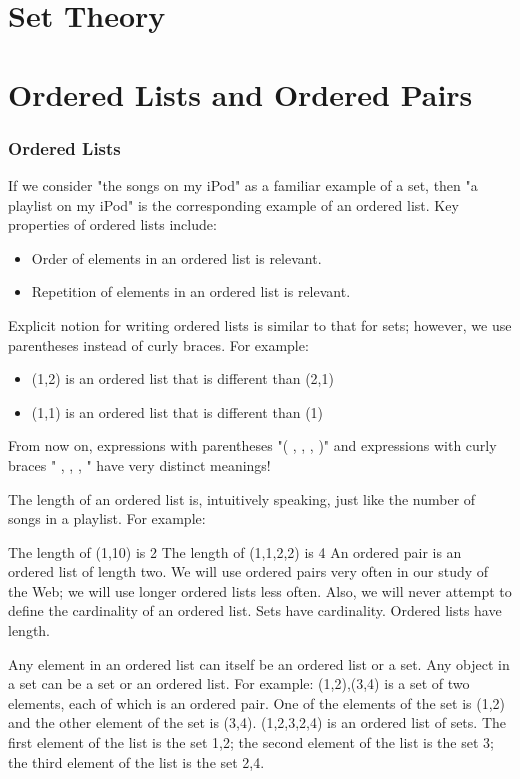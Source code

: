\documentclass{beamer}
\begin{document}
\section{Set Theory}


\section{Ordered Lists and Ordered Pairs}
\begin{frame}
\frametitle{Ordered Lists}
If we consider "the songs on my iPod" as a familiar example of a set, then "a playlist on my iPod" is the corresponding example of an ordered list. Key properties of ordered lists include:
\begin{itemize}
\item Order of elements in an ordered list is relevant.
\item Repetition of elements in an ordered list is relevant.
\end{itemize}

Explicit notion for writing ordered lists is similar to that for sets; however, we use parentheses instead of curly braces. For example:
\end{frame}
\begin{frame}
\begin{itemize}
\item (1,2) is an ordered list that is different than (2,1)
\item (1,1) is an ordered list that is different than (1)
\end{itemize}
From now on, expressions with parentheses "( , , , )" and expressions with curly braces "{ , , , }" have very distinct meanings!

The length of an ordered list is, intuitively speaking, just like the number of songs in a playlist. For example:
\end{frame}
\begin{frame}
The length of (1,10) is 2
The length of (1,1,2,2) is 4
An ordered pair is an ordered list of length two. We will use ordered pairs very often in our study of the Web; we will use longer ordered lists less often. Also, we will never attempt to define the cardinality of an ordered list. Sets have cardinality. Ordered lists have length.
\end{frame}
\begin{frame}
Any element in an ordered list can itself be an ordered list or a set. Any object in a set can be a set or an ordered list. For example:
{(1,2),(3,4)} is a set of two elements, each of which is an ordered pair. One of the elements of the set is (1,2) and the other element of the set is (3,4).
({1,2},{3},{2,4}) is an ordered list of sets. The first element of the list is the set {1,2}; the second element of the list is the set {3}; the third element of the list is the set {2,4}.
\end{frame}
\end{document}
